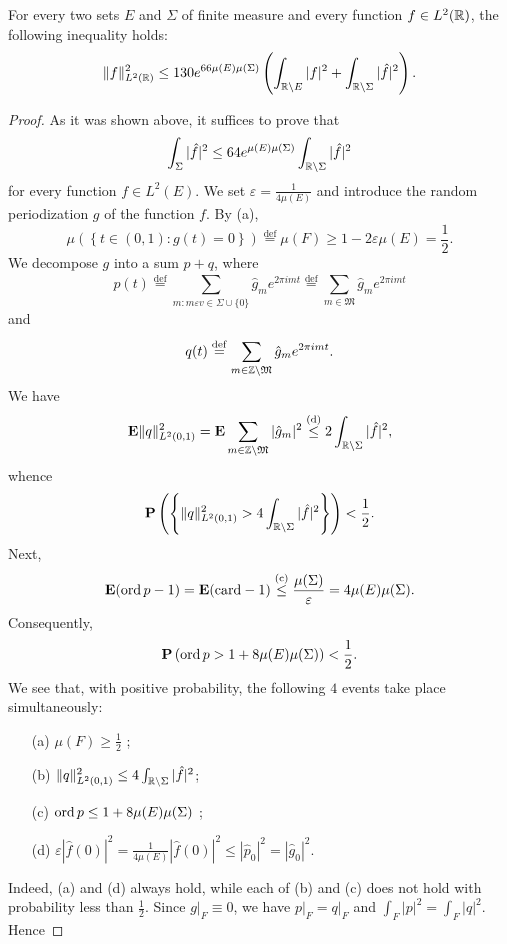   \begin{theorem}
    For every two sets $E$ and $\Sigma$ of finite measure and every function $f\in L^2(\mathbb{R})$, the following inequality holds:
    \[
      \|f\|^2_{L^2(\mathbb{R})}\le 130e^{66\mu(E)\mu(\Sigma)}\left( \int_{\mathbb{R}\backslash E}|f|^2+\int_{\mathbb{R}\backslash \Sigma}|\hat{f}|^2 \right) .
    \] 
  \end{theorem}
  \begin{proof}
    As it was shown above, it suffices to prove that 
    \[
      \int_{\Sigma}|\hat{f}|^2\le 64e^{\mu(E)\mu(\Sigma)}\int_{\mathbb{R}\backslash \Sigma}|\hat{f}|^2
    \] 
    for every function $f\in L^2(E)$. We set $\varepsilon =\frac{1}{4\mu(E)}$ and introduce the random periodization $g$ of the function $f$. By (a), 
    \[
      \mu\left( \left\{ t\in (0,1):g(t)=0 \right\}  \right) \overset{\mathrm{def}}{=}\mu(F)\ge 1-2\varepsilon \mu(E)=\frac{1}{2}.
    \] 
    We decompose $g$ into a sum $p+q$, where
    \[
      p(t)\overset{\mathrm{def}}{=}\sum_{m:m\varepsilon v\in \Sigma\cup \{0\} }^{} \hat{g}_me^{2\pi imt}\overset{\mathrm{def}}{=}\sum_{m\in\mathfrak{M} }^{} \hat{g}_me^{2\pi imt}
    \] 
    and 
     \[
       q(t)\overset{\mathrm{def}}{=}\sum_{m\in \mathbb{Z}\backslash \mathfrak{M}}^{} \hat{g}_me^{2\pi i mt}. 
    \] 
    We have 
    \[
      \mathbf{E}\|q\|^2_{L^2(0,1)}=\mathbf{E}\sum_{m\in \mathbb{Z}\backslash \mathfrak{M}}^{} |\hat{g}_m|^2\overset{\mathrm{(d)}}{\le }2\int_{\mathbb{R}\backslash \Sigma}|\hat{f}|^2,
    \] 
    whence
    \[
      \mathbf{P}\left( \left\{ \|q\|^2_{L^2(0,1)}>4\int_{\mathbb{R}\backslash \Sigma}|\hat{f}|^2 \right\}  \right) <\frac{1}{2}. 
    \] 
    Next, 
    \[
      \mathbf{E}(\operatorname{ord} p -1)=\mathbf{E}(\mathrm{card}-1)\overset{\mathrm{(c)}}{\le } \frac{\mu(\Sigma)}{\varepsilon }=4\mu(E)\mu(\Sigma).
    \] 
    Consequently, 
    \[
      \mathbf{P}\left( \operatorname{ord} p>1+8\mu(E)\mu(\Sigma)  \right) <\frac{1}{2}.
    \] 
    We see that, with positive probability, the following $4$ events take place simultaneously:
    \begin{enumerate}
      \item [(a)] $\mu(F)\ge \frac{1}{2}$ ;
      \item [(b)] $\|q\|^2_{L^2(0,1)}\le 4\int_{\mathbb{R}\backslash \Sigma}|\hat{f}|^2$;
      \item [(c)] $\operatorname{ord} p\le 1+8\mu(E)\mu(\Sigma)$ ;
      \item [(d)] $\varepsilon |\hat{f}(0)|^2=\frac{1}{4\mu(E)}|\hat{f}(0)|^2\le |\hat{p}_0|^2=|\hat{g}_0|^2$.
    \end{enumerate}
    Indeed, (a) and (d) always hold, while each of (b) and (c) does not hold with probability less than $\frac{1}{2}$. Since $g\lvert_{F}\equiv 0 $, we have $p\lvert_{F}=q\lvert_{F}$ and $\int_{F}|p|^2=\int_{F}|q|^2$. Hence 

\end{proof}
